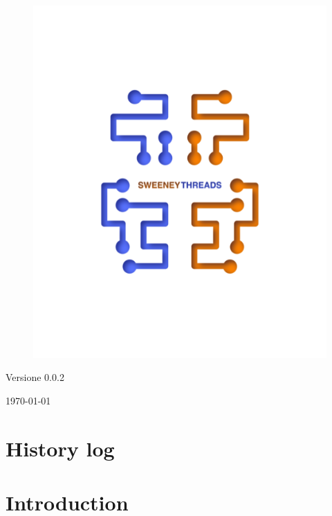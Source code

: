 \documentclass[a4paper]{article}
\begin{document}
\begin{titlepage}
		\begin{figure}[H]
			\centering
			\includegraphics[scale=0.8]{sweeney.png}
		\end{figure}
		\begin{center}
			Versione 0.0.2
		\end{center}
		{\large \today}\\[3cm] 
		\vfill  
	\end{titlepage}
	
	
	\tableofcontents
	
	\newpage
	\section*{History log}

	\newpage 
    \section{Introduction}
\end{document}
